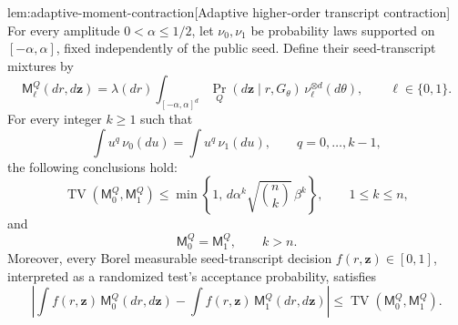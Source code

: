 \documentclass[11pt]{article}
\begin{document}
\begin{lemmav}{lem:adaptive-moment-contraction}[Adaptive higher-order transcript contraction]
For every amplitude \(0<\alpha\le1/2\), let \(\nu_0,\nu_1\) be probability laws supported on \([-\alpha,\alpha]\), fixed independently of the public seed. Define their seed-transcript mixtures by
\[
\mathsf M_\ell^Q(dr,d\mathbf z)
=
\lambda(dr)
\int_{[-\alpha,\alpha]^d}
\Pr_Q(d\mathbf z\mid r,G_\theta)\,
\nu_\ell^{\otimes d}(d\theta),
\qquad \ell\in\{0,1\}.
\]
For every integer \(k\ge1\) such that
\[
\int u^q\,\nu_0(du)=\int u^q\,\nu_1(du),
\qquad q=0,\ldots,k-1,
\]
the following conclusions hold:
\[
\operatorname{TV}(\mathsf M_0^Q,\mathsf M_1^Q)
\le
\min\left\{1,\,
d\alpha^k\sqrt{\binom nk}\,\beta^k\right\},
\qquad 1\le k\le n,
\]
and
\[
\mathsf M_0^Q=\mathsf M_1^Q,
\qquad k>n.
\]
Moreover, every Borel measurable seed-transcript decision \(f(r,\mathbf z)\in[0,1]\), interpreted as a randomized test's acceptance probability, satisfies
\[
\left|
\int f(r,\mathbf z)\,\mathsf M_0^Q(dr,d\mathbf z)
-
\int f(r,\mathbf z)\,\mathsf M_1^Q(dr,d\mathbf z)
\right|
\le
\operatorname{TV}(\mathsf M_0^Q,\mathsf M_1^Q).
\]
\end{lemmav}
\end{document}
